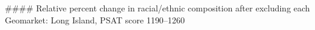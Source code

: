 #### Relative percent change in racial/ethnic composition after excluding each Geomarket: Long Island, PSAT score 1190–1260
